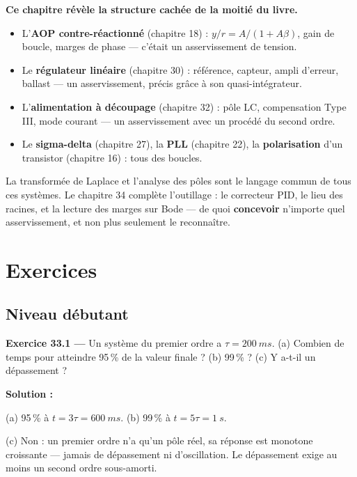 \documentclass[12pt,a4paper,twoside]{book}
\begin{document}
\begin{intuition}
\textbf{Ce chapitre révèle la structure cachée de la moitié du livre.}
\begin{itemize}[nosep]
\item L'\textbf{AOP contre-réactionné} (chapitre 18) : $y/r = A/(1+A\beta)$, gain de boucle, marges de phase --- c'était un asservissement de tension.
\item Le \textbf{régulateur linéaire} (chapitre 30) : référence, capteur, ampli d'erreur, ballast --- un asservissement, précis grâce à son quasi-intégrateur.
\item L'\textbf{alimentation à découpage} (chapitre 32) : pôle LC, compensation Type III, mode courant --- un asservissement avec un procédé du second ordre.
\item Le \textbf{sigma-delta} (chapitre 27), la \textbf{PLL} (chapitre 22), la \textbf{polarisation} d'un transistor (chapitre 16) : tous des boucles.
\end{itemize}
La transformée de Laplace et l'analyse des pôles sont le langage commun de tous ces systèmes. Le chapitre 34 complète l'outillage : le correcteur PID, le lieu des racines, et la lecture des marges sur Bode --- de quoi \textbf{concevoir} n'importe quel asservissement, et non plus seulement le reconnaître.
\end{intuition}

\section*{Exercices}

\subsection*{Niveau débutant}

\textbf{Exercice 33.1 ---} Un système du premier ordre a $\tau = \SI{200}{ms}$. (a) Combien de temps pour atteindre 95\,\% de la valeur finale ? (b) 99\,\% ? (c) Y a-t-il un dépassement ?

\begin{pratique}
\textbf{Solution :}

(a) 95\,\% à $t = 3\tau = \SI{600}{ms}$. \quad (b) 99\,\% à $t = 5\tau = \SI{1}{s}$.

(c) Non : un premier ordre n'a qu'un pôle réel, sa réponse est monotone croissante --- jamais de dépassement ni d'oscillation. Le dépassement exige au moins un second ordre sous-amorti.
\end{pratique}
\end{document}
